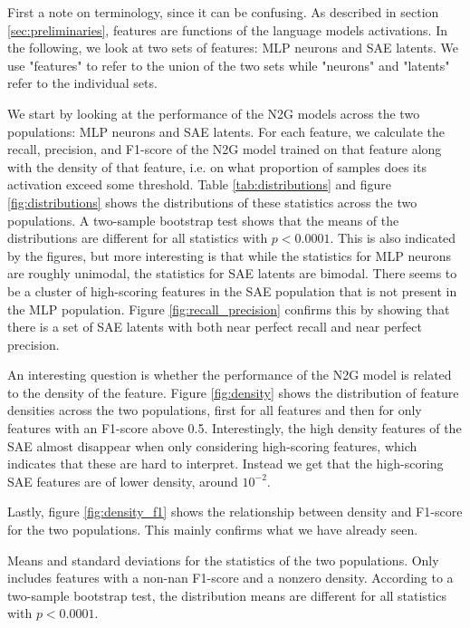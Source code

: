 First a note on terminology, since it can be confusing.
As described in section \ref{sec:preliminaries}, features are functions of the language models activations.
In the following, we look at two sets of features: MLP neurons and SAE latents.
We use "features" to refer to the union of the two sets while "neurons" and "latents" refer to the individual sets.

We start by looking at the performance of the N2G models across the two populations: MLP neurons and SAE latents.
For each feature, we calculate the recall, precision, and F1-score of the N2G model trained on that feature along with the density of that feature, i.e. on what proportion of samples does its activation exceed some threshold.
Table \ref{tab:distributions} and figure \ref{fig:distributions} shows the distributions of these statistics across the two populations.
A two-sample bootstrap test shows that the means of the distributions are different for all statistics with $p<0.0001$.
This is also indicated by the figures, but more interesting is that while the statistics for MLP neurons are roughly unimodal, the statistics for SAE latents are bimodal.
There seems to be a cluster of high-scoring features in the SAE population that is not present in the MLP population.
Figure \ref{fig:recall_precision} confirms this by showing that there is a set of SAE latents with both near perfect recall and near perfect precision.

An interesting question is whether the performance of the N2G model is related to the density of the feature.
Figure \ref{fig:density} shows the distribution of feature densities across the two populations, first for all features and then for only features with an F1-score above 0.5.
Interestingly, the high density features of the SAE almost disappear when only considering high-scoring features, which indicates that these are hard to interpret.
Instead we get that the high-scoring SAE features are of lower density, around $10^{-2}$.

Lastly, figure \ref{fig:density_f1} shows the relationship between density and F1-score for the two populations.
This mainly confirms what we have already seen.

\begin{table}[]
    \centering
    
    \caption{Means and standard deviations for the statistics of the two populations. Only includes features with a non-nan F1-score and a nonzero density. According to a two-sample bootstrap test, the distribution means are different for all statistics with $p<0.0001$.}
    \label{tab:distributions}
    \end{table}

